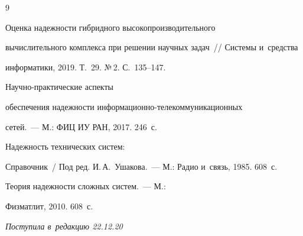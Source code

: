   

{\small\frenchspacing

{%


\begin{thebibliography}{9}


 Оценка надежности гибридного высокопроизводительного 

вычислительного комплекса при решении научных задач~/\!\!/ Системы и~средства 

информатики, 2019. Т.~29. №\,2. С.~135--147. 


 На\-уч\-но-прак\-ти\-че\-ские аспекты 

обеспечения надежности ин\-фор\-ма\-ци\-он\-но-те\-ле\-ком\-му\-ни\-ка\-ци\-он\-ных 

сетей.~--- М.: ФИЦ ИУ РАН, 2017. 246~с.




 Надежность технических систем: 

Справочник~/ Под ред. И.\,А.~Ушакова.~--- М.: Радио и~связь, 1985. 608~с.




 Теория надежности слож\-ных сис\-тем.~--- М.: 

Физматлит, 2010. 608~с.



       \end{thebibliography}

} }







\vspace*{-3pt}



\hfill{\small\textit{Поступила в~редакцию 22.12.20}}









